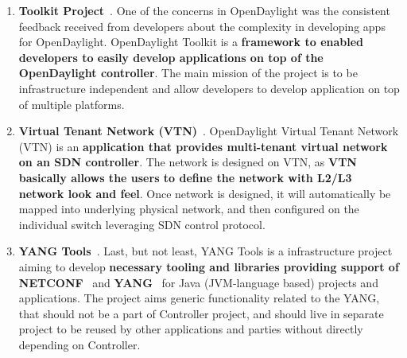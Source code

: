 \documentclass[a4paper, 12pt]{book}
\begin{document}
\begin{enumerate}
\item{\textbf{Toolkit Project}}~\cite{OpenDaylightWikiToolkit}. One of the concerns in OpenDaylight was the consistent feedback received from developers about the complexity in developing apps for OpenDaylight. OpenDaylight Toolkit is a \textbf{framework to enabled developers to easily develop applications on top of the OpenDaylight controller}. The main mission of the project is to be infrastructure independent and allow developers to develop application on top of multiple platforms.
\item{\textbf{Virtual Tenant Network (VTN)}}~\cite{OpenDaylightWikiVTN}. OpenDaylight Virtual Tenant Network (VTN) is an \textbf{application that provides multi-tenant virtual network on an SDN controller}. The network is designed on VTN, as \textbf{VTN basically allows the users to define the network with L2/L3 network look and feel}. Once network is designed, it will automatically be mapped into underlying physical network, and then configured on the individual switch leveraging SDN control protocol.
\item{\textbf{YANG Tools}}~\cite{OpenDaylightWikiYANG}. Last, but not least, YANG Tools is a infrastructure project aiming to develop \textbf{necessary tooling and libraries providing support of NETCONF}~\cite{NETCONF} and \textbf{YANG}~\cite{YANG} for Java (JVM-language based) projects and applications. The project aims generic functionality related to the YANG, that should not be a part of Controller project, and should live in separate project to be reused by other applications and parties without directly depending on Controller.
\end{enumerate}
\end{document}
